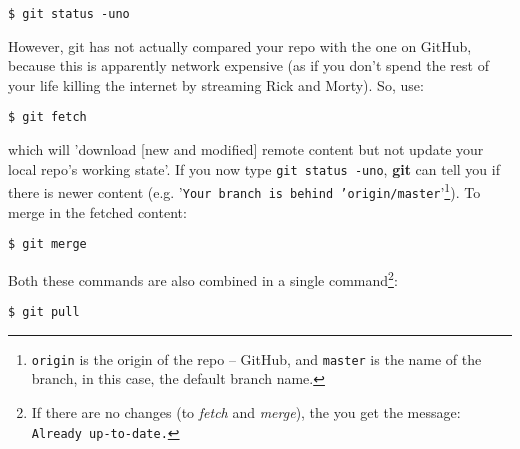 \vspace{-2mm}
\begin{verbatim}
$ git status -uno
\end{verbatim}
\vspace{-2mm}

\noindent However, git has not actually compared your repo with the one on GitHub, because this is apparently network expensive (as if you don't spend the rest of your life killing the internet by streaming Rick and Morty). So, use:

\vspace{-2mm}
\begin{verbatim}
$ git fetch
\end{verbatim}
\vspace{-2mm}

\noindent which will 'download [new and modified] remote content but not update your local repo's working state'. If you now type \texttt{git status -uno}, \textbf{git} can tell you if there is newer content (e.g. '\texttt{Your branch is behind 'origin/master}'\footnote{\texttt{origin} is the origin of the repo -- GitHub, and \texttt{master} is the name of the branch, in this case, the default branch name.}). To merge in the fetched content:

\vspace{-2mm}
\begin{verbatim}
$ git merge
\end{verbatim}
\vspace{-2mm}

Both these commands are also combined in a single command\footnote{If there are no changes (to \textit{fetch} and \textit{merge}), the you get the message: \texttt{Already up-to-date.}}:

\vspace{-2mm}
\begin{verbatim}
$ git pull
\end{verbatim}
\vspace{-2mm}

